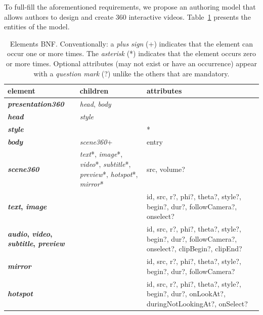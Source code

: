 To full-fill the aforementioned requirements, we propose an authoring model that allows authors to design and create 360 interactive videos. Table~\ref{tbl:entities} presents the entities of the model.
\begin{table}[!ht]
\footnotesize
\begin{tabularx}{\linewidth}{ p{3cm} p{4cm} X }
\hline

\textbf{element} & \textbf{children} & \textbf{attributes}\\ \hline

\textbf{\emph{presentation360}}  & \emph{head}, \emph{\emph{body}} &  \\ \hline

\textbf{\emph{head}}  & \emph{style} &  \\  \hline

\textbf{\emph{style}}  &  & * \\  \hline

\textbf{\emph{body}}  & \emph{scene360}+ & entry \\ \hline

\textbf{\emph{scene360}}  & \emph{text}*, \emph{image}*, \emph{video}*,
\emph{subtitle}*, \emph{preview}*, \emph{hotspot}*, \emph{mirror}* & src, volume? \\  \hline

\textbf{\emph{text}, \emph{image}}  &  & 
id, src, r?, phi?, theta?, style?, begin?, dur?, followCamera?, onselect? \\ \hline

\textbf{\emph{audio}, \emph{video}, \emph{subtitle}, \emph{preview}}  &  & 
id, src, r?, phi?, theta?, style?, begin?, dur?, followCamera?, onselect?, clipBegin?, clipEnd?\\ \hline

\textbf{\emph{mirror}}  &  & 
id, src, r?, phi?, theta?, style?, begin?, dur?, 
followCamera? \\ \hline

\textbf{\emph{hotspot}}  &  & 
id, src, r?, phi?, theta?, 
style?, begin?, dur?,  onLookAt?, duringNotLookingAt?, onSelect? \\ \hline

\hline
 \end{tabularx}
\caption{Elements BNF. Conventionally: a \emph{plus sign} (+) indicates that the element can occur one or more times. The \emph{asterisk} (*) indicates that the element occurs zero or more times. Optional attributes (may not exist or have an occurrence) appear with a \emph{question mark} (?) unlike the others that are mandatory. 
}
\label{tbl:entities}
\end{table}

